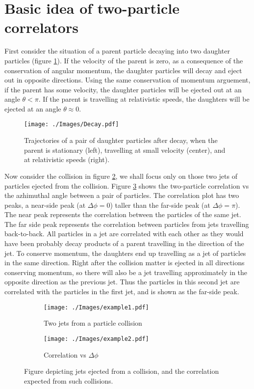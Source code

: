 \documentclass[12pt,a4paper,twoside]{report}
\begin{document}
\section{Basic idea of two-particle correlators}
First consider the situation of a parent particle decaying into two daughter particles (figure \ref{fig:v-vs-theta}). If the velocity of the parent is zero, as a consequence of the conservation of angular momentum, the daughter particles will decay and eject out in opposite directions. Using the same conservation of momentum arguement, if the parent has some velocity, the daughter particles will be ejected out at an angle $\theta<\pi$. If the parent is travelling at relativistic speeds, the daughters will be ejected at an angle $\theta\approx0$.
\begin{figure}[H]
	\texttt{[image: ./Images/Decay.pdf]}
	\caption{Trajectories of a pair of daughter particles after decay, when the parent is stationary (left), travelling at small velocity (center), and at relativistic speeds (right).}
	\label{fig:v-vs-theta}
\end{figure}
Now consider the collision in figure \ref{fig:Examples::example1}, we shall focus only on those two jets of particles ejected from the collision. Figure \ref{fig:Examples::example2} shows the two-particle correlation vs the azhimuthal angle between a pair of particles. The correlation plot has two peaks, a near-side peak (at $\Delta\phi=0$) taller than the far-side peak (at $\Delta\phi=\pi$). The near peak represents the correlation between the particles of the same jet. The far side peak represents the correlation between particles from jets travelling back-to-back. All particles in a jet are correlated with each other as they would have been probably decay products of a parent travelling in the direction of the jet. To conserve momentum, the daughters end up travelling as a jet of particles in the same direction. Right after the collision matter is ejected in all directions conserving momentum, so there will also be a jet travelling approximately in the opposite direction as the previous jet. Thus the particles in this second jet are correlated with the particles in the first jet, and is shown as the far-side peak.
\begin{figure}[H]
	\begin{subfigure}{0.49\linewidth}
		\texttt{[image: ./Images/example1.pdf]}
		\caption{Two jets from a particle collision}
		\label{fig:Examples::example1}
	\end{subfigure}
	\begin{subfigure}{0.49\linewidth}
		\texttt{[image: ./Images/example2.pdf]}
		\caption{Correlation vs $\Delta\phi$}
		\label{fig:Examples::example2}
	\end{subfigure}
	\caption{Figure depicting jets ejected from a collision, and the correlation expected from such collisions.}
	\label{fig:Examples}
\end{figure}
\end{document}
